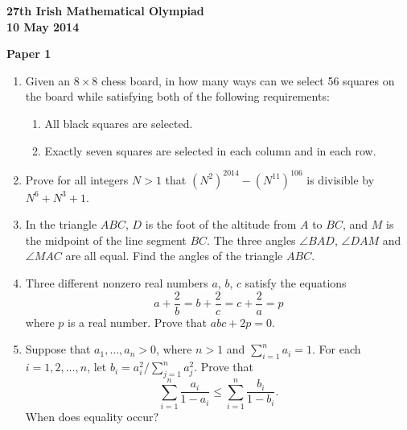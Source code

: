 \documentclass[12pt]{article}
\begin{document}
\begin{center}
{\large\bfseries 27th Irish Mathematical Olympiad\\10 May 2014}
\end{center}
\bigskip\noindent\textbf{Paper 1}\bigskip
\begin{enumerate}
\item Given an $8 \times 8$ chess board, in how many ways can we select 56 squares on the board while satisfying both of the following requirements:
\begin{enumerate}
\item[(a)] All black squares are selected.
\item[(b)] Exactly seven squares are selected in each column and in each row.
\end{enumerate}

\item Prove for all integers $N > 1$ that $(N^2)^{2014} - (N^{11})^{106}$ is divisible by $N^6 + N^3 + 1$.

\item In the triangle $ABC$, $D$ is the foot of the altitude from $A$ to $BC$, and $M$ is the midpoint of the line segment $BC$. The three angles $\angle BAD$, $\angle DAM$ and $\angle MAC$ are all equal. Find the angles of the triangle $ABC$.

\item Three different nonzero real numbers $a$, $b$, $c$ satisfy the equations
\[
a + \frac{2}{b} = b + \frac{2}{c} = c + \frac{2}{a} = p
\]
where $p$ is a real number. Prove that $abc + 2p = 0$.

\item Suppose that $a_1, \ldots, a_n > 0$, where $n > 1$ and $\sum_{i=1}^n a_i = 1$. For each $i = 1, 2, \ldots, n$, let $b_i = a_i^2 / \sum_{j=1}^n a_j^2$. Prove that
\[
\sum_{i=1}^{n} \frac{a_i}{1 - a_i} \leq \sum_{i=1}^{n} \frac{b_i}{1 - b_i}.
\]
When does equality occur?
\end{enumerate}
\end{document}
